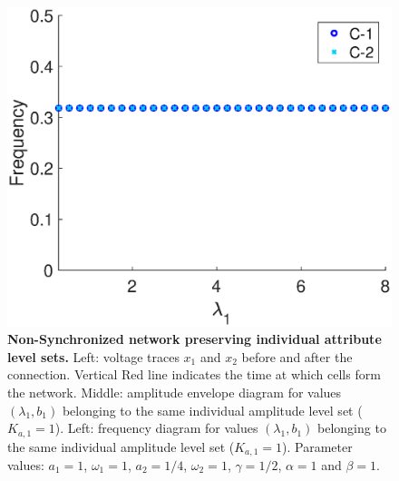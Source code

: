 \begin{figure}[htb]
\begin{minipage}{0.32\linewidth}
\begin{center}
            \end{center}
        \end{minipage} 
    \begin{minipage}{0.32\linewidth}
        \begin{center}
            \includegraphics[width=1\linewidth]{Images/photo10_3.eps}
        \end{center}
    \end{minipage} 
  \caption{\textbf{Non-Synchronized network preserving individual attribute level sets.} Left: voltage traces $x_{1}$ and $x_{2}$ before and after the connection. Vertical Red line indicates the time at which cells form the network. Middle: amplitude envelope diagram for values $(\lambda_{1},b_{1})$ belonging to the same individual amplitude level set ($K_{a,1}=1$). Left: frequency diagram for values $(\lambda_{1},b_{1})$ belonging to the same individual amplitude level set ($K_{a,1}=1$). Parameter values: $a_{1} = 1$, $\omega_{1} = 1$, $a_{2}=1/4$, $\omega_{2} = 1$, $\gamma = 1/2$, $\alpha = 1$ and $\beta=1$.}
  \label{photo11}
\end{figure}

